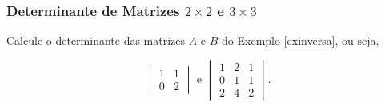 \begin{frame}
    \frametitle{Determinante de Matrizes $2 \times 2$ e $3 \times 3$}
    
    \begin{exemplo}
        Calcule o determinante das matrizes $A$ e $B$ do Exemplo \ref{exinversa}, ou seja,
        
        \begin{displaymath}  
            \begin{vmatrix}
                1 & 1  \\
                0 & 2
            \end{vmatrix}
        \text{ e }  
            \begin{vmatrix}
                1 & 2 & 1 \\
                0 & 1 & 1 \\
                2 & 4 & 2 
            \end{vmatrix}.
        \end{displaymath}
    \end{exemplo}

\end{frame}


